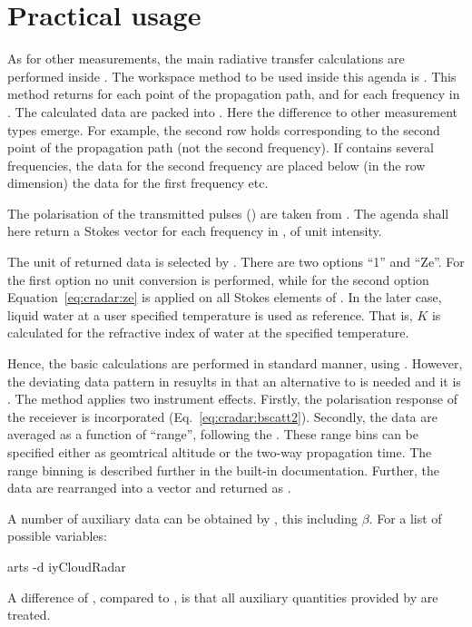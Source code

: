 \section{Practical usage}
\label{sec:cradar:usage}

As for other measurements, the main radiative transfer calculations are
performed inside . The workspace method to be used
inside this agenda is . This method returns 
for each point of the propagation path, and for each frequency in
. The calculated data are packed into . Here
the difference to other measurement types emerge. For example, the second row
holds  corresponding to the second point of the propagation path
(not the second frequency). If  contains several
frequencies, the data for the second frequency are placed below (in the row
dimension) the data for the first frequency etc. 

The polarisation of the transmitted pulses () are taken from
. The agenda shall here return a Stokes
vector for each frequency in , of unit intensity.

The unit of returned data is selected by . There are two
options ``1'' and ``Ze''. For the first option no unit conversion is performed,
while for the second option Equation~\ref{eq:cradar:ze} is applied on all
Stokes elements of . In the later case, liquid water at a user
specified temperature is used as reference. That is, $K$ is calculated for the
refractive index of water at the specified temperature.

Hence, the basic calculations are performed in standard manner, using
. However, the deviating data pattern in
 resuylts in that an alternative to  is needed
and it is . The method applies two instrument effects.
Firstly, the polarisation response of the receiever is incorporated
(Eq.~\ref{eq:cradar:bscatt2}). Secondly, the data are averaged as a
function of ``range'', following the . These range bins
can be specified either as geomtrical altitude or the two-way propagation time.
The range binning is described further in the built-in documentation.
Further, the data are rearranged into a vector and returned as .

A number of auxiliary data can be obtained by , this
including $\beta$. For a list of possible variables:
\begin{code}
arts -d iyCloudRadar
\end{code}
A difference of , compared to , is
that all auxiliary quantities provided by  are
treated.

